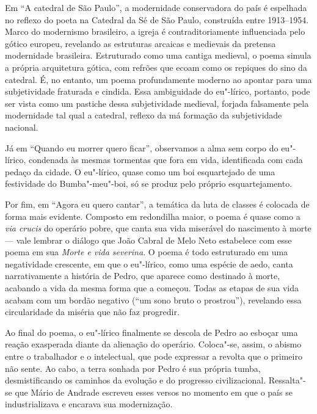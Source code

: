 Em ``A catedral de São Paulo'', a modernidade conservadora do país é espelhada no reflexo do poeta na Catedral da Sé de São Paulo, construída entre 1913--1954.
Marco do modernismo brasileiro, a igreja é contraditoriamente influenciada pelo gótico europeu, revelando as estruturas arcaicas e medievais da pretensa modernidade brasileira. 
Estruturado como uma cantiga medieval, o poema simula a própria arquitetura gótica, com refrões que ecoam como os repiques do sino da catedral. É, no entanto, um poema profundamente moderno ao apontar para uma subjetividade fraturada e cindida. Essa ambiguidade do eu"-lírico, portanto, pode ser vista como um pastiche dessa subjetividade medieval, forjada falsamente pela modernidade tal qual a catedral, reflexo da má formação da subjetividade nacional.

Já em ``Quando eu morrer quero ficar'', observamos a alma sem corpo do eu"-lírico, condenada às mesmas tormentas que fora em vida, identificada com cada pedaço da cidade. O eu"-lírico, quase como um boi esquartejado de uma festividade do Bumba"-meu"-boi, só se produz pelo próprio esquartejamento.

Por fim, em ``Agora eu quero cantar'', a temática da luta de classes é colocada de forma mais evidente. Composto em redondilha maior, o poema é quase como a \textit{via crucis} do operário pobre, que canta sua vida miserável do nascimento à morte --- vale lembrar o diálogo que João Cabral de Melo Neto estabelece com esse poema em sua \textit{Morte e vida severina}.
O poema é todo estruturado em uma negatividade crescente, em que o eu"-lírico, como uma espécie de aedo, canta narrativamente a história de Pedro, que aparece como destinado à morte, acabando a vida da mesma forma que a começou.
Todas as etapas de sua vida acabam com um bordão negativo (``um sono bruto o prostrou''), revelando essa circularidade da miséria que não faz progredir.

Ao final do poema, o eu"-lírico finalmente se descola de Pedro ao esboçar uma reação exasperada diante da alienação do operário.
Coloca"-se, assim, o abismo entre o trabalhador e o intelectual, que pode expressar a revolta que o primeiro não sente. Ao cabo, a terra sonhada por Pedro é sua própria tumba, desmistificando os caminhos da evolução e do progresso civilizacional.
Ressalta"-se que Mário de Andrade escreveu esses versos no momento em que o país se industrializava e encarava sua modernização.


